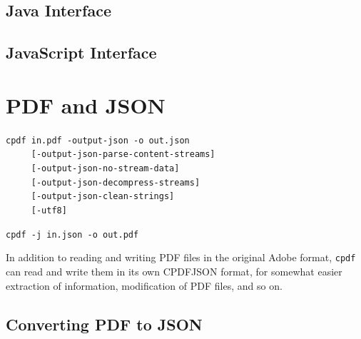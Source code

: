 \documentclass{book}
\begin{document}
\begin{jcpdflib}
\clearpage
\section*{Java Interface}
\begin{small}\tt

\end{small}
\end{jcpdflib}

\begin{jscpdflib}
\clearpage
\section*{JavaScript Interface}
\begin{small}\tt

\end{small}
\end{jscpdflib}

\chapter{PDF and JSON}\label{chap:15}\pagestyle{fancy}
  {\small\begin{framed}
  \noindent\verb!cpdf in.pdf -output-json -o out.json!\\
  \noindent\verb!     [-output-json-parse-content-streams]!\\
  \noindent\verb!     [-output-json-no-stream-data]!\\
  \noindent\verb!     [-output-json-decompress-streams]!\\
  \noindent\verb!     [-output-json-clean-strings]!\\
  \noindent\verb!     [-utf8]!

\vspace{1.5mm}

  \noindent\verb!cpdf -j in.json -o out.pdf!
  \end{framed}}

\label{cpdfjson}
In addition to reading and writing PDF files in the original Adobe format, \texttt{cpdf} can read and write them in its own CPDFJSON format, for somewhat easier extraction of information, modification of PDF files, and so on.

\section{Converting PDF to JSON}
\end{document}
